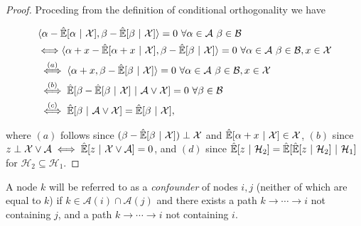 \documentclass[12pt]{article}
\def\H{\mathcal{H}}  %
\newcommand{\linE}[2]{\hat{\E}[#1\ |\ #2]}  %
\newcommand{\anc}[1]{\mathcal{A}(#1)}  %
\newcommand{\gcgpath}[2]{#1 \rightarrow \cdots \rightarrow #2}  %
\begin{document}
\begin{proof}
  Proceding from the definition of conditional orthogonality we have

  \begin{align*}
    &\inner{\alpha - \linE{\alpha}{\mathcal{X}}}{\beta - \linE{\beta}{\mathcal{X}}} = 0 \ \forall \alpha \in \mathcal{A}\ \beta \in \mathcal{B}\\
    &{\iff} \inner{\alpha + x - \linE{\alpha + x}{\mathcal{X}}}{\beta - \linE{\beta}{\mathcal{X}}} = 0 \ \forall \alpha \in \mathcal{A}\ \beta \in \mathcal{B}, x \in \mathcal{X}\\
    &\overset{(a)}{\iff} \inner{\alpha + x}{\beta - \linE{\beta}{\mathcal{X}}} = 0 \ \forall \alpha \in \mathcal{A}\ \beta \in \mathcal{B}, x \in \mathcal{X}\\
    &\overset{(b)}{\iff} \linE{\beta - \linE{\beta}{\mathcal{X}}}{\mathcal{A} \vee \mathcal{X}} = 0\ \forall \beta \in \mathcal{B}\\
    &\overset{(c)}{\iff} \linE{\beta}{\mathcal{A} \vee \mathcal{X}} = \linE{\beta}{\mathcal{X}},
  \end{align*}

  where $(a)$ follows since $(\beta - \linE{\beta}{\mathcal{X}}) \perp \mathcal{X}$ and $\linE{\alpha + x}{\mathcal{X}} \in \mathcal{X}$, $(b)$ since $z \perp \mathcal{X} \vee \mathcal{A} \iff \linE{z}{\mathcal{X} \vee \mathcal{A}} = 0$, and $(d)$ since $\linE{z}{\H_2} = \linE{\linE{z}{\H_2}}{\H_1}$ for $\H_2 \subseteq \H_1$.
  

\end{proof}

\begin{definition}[\hl{Confounder}]
  A node $k$ will be referred to as a \textit{confounder} of nodes
  $i, j$ (neither of which are equal to $k$) if
  $k \in \anc{i} \cap \anc{j}$ and there exists a path
  $\gcgpath{k}{i}$ not containing $j$, and a path $\gcgpath{k}{i}$
  not containing $i$.
\end{definition}
\end{document}
